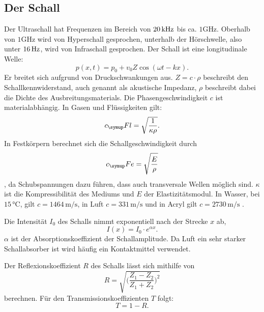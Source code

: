 \subsection{Der Schall}
Der Ultraschall hat Frequenzen im Bereich von $20 \,\si{\kilo\hertz}$ bis ca. $1 \si{\giga\hertz}$.
Oberhalb von $1 \si{\giga\hertz}$ wird von Hyperschall gesprochen, unterhalb der Hörschwelle,
also unter $16 \,\si{\hertz}$, wird von Infraschall gesprochen.
Der Schall ist eine longitudinale Welle:
\begin{equation}
  p(x,t)= p_0 + v_0 Z \cos{(\omega t -kx)}.
\end{equation}
Er breitet sich aufgrund von Druckschwankungen aus. $Z= c \cdot \rho$ beschreibt
den Schallkennwiderstand, auch genannt als akustische Impedanz, $\rho$ beschreibt
dabei die Dichte des Ausbreitungsmaterials. Die Phasengeschwindigkeit $c$ ist
materialabhängig. In Gasen und Flüssigkeiten gilt:
\begin{equation}
  c_\su{Fl} = \sqrt{\frac{1}{\kappa \rho}}.
\end{equation}
In Festkörpern berechnet sich die Schallgeschwindigkeit durch
\begin{equation}
  c_\su{Fe}= \sqrt{\frac{E}{\rho}}
\end{equation}
, da Schubspannungen dazu führen, dass auch transversale Wellen möglich sind.
$\kappa$ ist die Kompressibilität des Mediums und $E$ der Elastizitätsmodul.
In Wasser, bei $15 \,\si{\celsius}$, gilt $c = 1464 \,\si{\meter\per\second}$,
in Luft $c = 331 \,\si{\meter\per\second}$ \cite{spektrum} und in Acryl
gilt $c = 2730 \,\si{\meter\per\second}$ \cite{olympus}.

Die Intensität $I_0$ des Schalls nimmt exponentiell nach der Strecke $x$ ab,
\begin{equation}
  I(x) = I_0 \cdot e^{\alpha x}.
\end{equation}
$\alpha$ ist der Absorptionskoeffizient der Schallamplitude. Da Luft ein sehr
starker Schallabsorber ist wird häufig ein Kontaktmittel verwendet.

Der Reflexionskoeffizient $R$ des Schalls lässt sich mithilfe von
\begin{equation}
  R = \sqrt{\Bigg(\frac{Z_1 - Z_2}{Z_1 + Z_2}\Bigg)^2}
\end{equation}
berechnen. Für den Transmissionskoeffizienten $T$ folgt:
\begin{equation}
  T = 1-R.
\end{equation}

